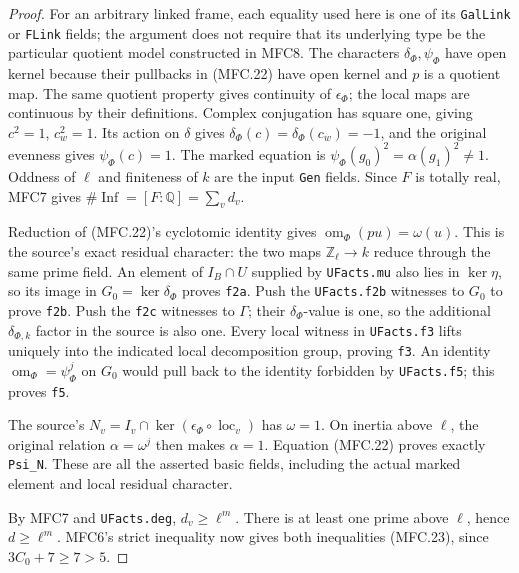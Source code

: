\documentclass[11pt,a4paper]{article}
\numberwithin{equation}{section}
\theoremstyle{remark}\newtheorem{remark}[theorem]{Remark}
\begin{document}
\begin{proof}
For an arbitrary linked frame, each equality used here is one
of its \texttt{Gal\allowbreak Link} or \texttt{FLink} fields; the argument
does not require that its underlying type be the particular
quotient model constructed in MFC8.
The characters \(\delta_\Phi,\psi_\Phi\) have open kernel
because their pullbacks in (MFC.22) have open kernel and \(p\)
is a quotient map.  The same quotient property gives continuity
of \(\epsilon_\Phi\); the local maps are continuous by their
definitions.  Complex conjugation has square one, giving
\(c^2=1\), \(c_w^2=1\).  Its action on \(\delta\) gives
\(\delta_\Phi(c)=\delta_\Phi(c_w)=-1\), and the original
evenness gives \(\psi_\Phi(c)=1\).  The marked equation is
\(\psi_\Phi(g_0)^2=\alpha(g_1)^2\ne1\).
Oddness of \(\ell\) and finiteness of \(k\) are the input
\texttt{Gen} fields.  Since \(F\) is totally real, MFC7 gives
\(\#\operatorname{Inf}=[F:\mathbb Q]=\sum_vd_v\).

Reduction of (MFC.22)'s cyclotomic identity gives
\(\operatorname{om}_\Phi(pu)=\omega(u)\).  This is the
source's exact residual character: the two maps
\(\mathbb Z_\ell\to k\) reduce through the same prime field.
An element of \(I_B\cap U\) supplied by \texttt{UFacts.\allowbreak mu}
also lies in \(\ker\eta\), so its image in
\(G_0=\ker\delta_\Phi\) proves \texttt{f2a}.
Push the \texttt{UFacts.\allowbreak f2b} witnesses to \(G_0\) to prove
\texttt{f2b}.  Push the \texttt{f2c} witnesses to \(\Gamma\);
their \(\delta_\Phi\)-value is one, so the additional
\(\delta_{\Phi,k}\) factor in the source is also one.
Every local witness in \texttt{UFacts.\allowbreak f3} lifts uniquely into
the indicated local decomposition group, proving \texttt{f3}.
An identity \(\operatorname{om}_\Phi=\psi_\Phi^j\) on
\(G_0\) would pull back to the identity forbidden by
\texttt{UFacts.\allowbreak f5}; this proves \texttt{f5}.

The source's
\(N_v=I_v\cap\ker(\epsilon_\Phi\circ\operatorname{loc}_v)\)
has \(\omega=1\).  On inertia above \(\ell\), the original
relation \(\alpha=\omega^j\) then makes \(\alpha=1\).
Equation (MFC.22) proves exactly \texttt{Psi\_\allowbreak N}.
These are all the asserted basic fields, including the actual
marked element and local residual character.

By MFC7 and \texttt{UFacts.\allowbreak deg}, \(d_v\ge\ell^m\).
There is at least one prime above \(\ell\), hence
\(d\ge\ell^m\).  MFC6's strict inequality now gives both
inequalities (MFC.23), since \(3C_0+7\ge7>5\).
\end{proof}
\end{document}
